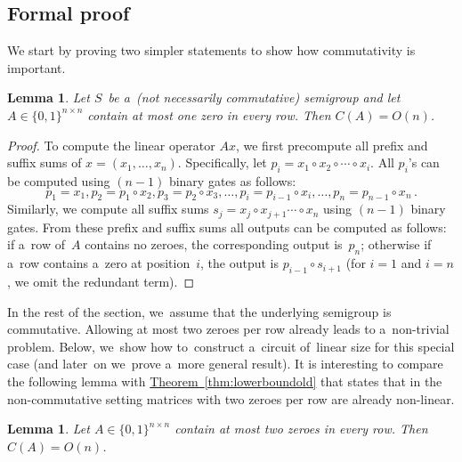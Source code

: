 \documentclass[11pt]{article}
\numberwithin{equation}{section}
\newtheorem{lemma}[theorem]{Lemma}
\theoremstyle{definition}
\theoremstyle{plain}
\newcommand{\expref}[2]{\hyperref[#2]{#1~\ref{#2}}}
\theoremstyle{plain}\newtheorem{observation}[theorem]{Observation}
\begin{document}
\subsection{Formal proof}
We start by proving two simpler statements to show how commutativity is
important.

\begin{lemma}\label{lemma:easy}
Let $S$~be a~(not necessarily commutative) semigroup and let
$A \in \{0,1\}^{n \times n}$ contain at most
one zero in every row. Then
$C(A) = O(n)$.
\end{lemma}

\begin{proof}
To compute the linear operator $Ax$, we first
precompute all prefix and suffix sums of $x=(x_1, \dotsc, x_n)$.
Specifically, let $p_i=x_1 \circ x_2 \circ \dotsb \circ x_i$. All $p_i$'s can be
computed using $(n-1)$ binary gates as follows:
\[
p_1=x_1, p_2=p_1 \circ x_2, p_3=p_2 \circ x_3, \dotsc, p_i=p_{i-1} \circ x_i, \dotsc, p_n=p_{n-1}\circ x_n\,.
\]
Similarly, we compute all suffix sums
$s_j=x_j \circ x_{j+1} \dotsb \circ x_n$ using
$(n-1)$ binary gates. From these prefix and suffix sums
all outputs can be
computed as follows: if a~row of~$A$ contains no zeroes,
the corresponding
output is~$p_n$; otherwise if a~row contains a~zero at position~$i$, the
output is $p_{i-1} \circ s_{i+1}$ (for $i=1$ and $i=n$, we omit the redundant
term).
\end{proof}

In the rest of the section, we~assume that the
underlying semigroup is
commutative. Allowing at most two zeroes per row already leads to a~non-trivial
problem.
Below, we~show how to~construct a~circuit of~linear size for
this special case (and later~on we~prove a~more general result).
It is interesting to compare the following lemma
with \expref{Theorem}{thm:lowerboundold} that states that in the
non-commutative setting matrices with two zeroes per row are already
%
%
non-linear.
%
%
%
%

\begin{lemma} \label{lem:at_most_2}
Let $A \in \{0,1\}^{n \times n}$ contain at most two zeroes in every row. Then
$C(A) = O(n)$.
\end{lemma}
\end{document}
